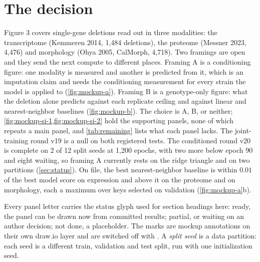 
\section{The decision}
\label{sec:decision}

Figure 3 covers single-gene deletions read out in three modalities: the transcriptome
(Kemmeren 2014, 1,484 deletions), the proteome (Messner 2023, 4,476) and morphology (Ohya
2005, CalMorph, 4,718). Two framings are open and they send the next compute to different
places. Framing A is a conditioning figure: one modality is measured and another is
predicted from it, which is an imputation claim and needs the conditioning measurement for
every strain the model is applied to (\cref{fig:mockup-a}). Framing B is a genotype-only
figure: what the deletion alone predicts against each replicate ceiling and against linear
and nearest-neighbor baselines (\cref{fig:mockup-b}). The choice is A, B, or neither;
\cref{fig:mockup-si-1,fig:mockup-si-2} hold the supporting panels, none of which repeats a
main panel, and
\cref{tab:remaining} lists what each panel lacks. The joint-training round v19 is a null on
both registered tests. The conditioned round v20 is complete on 2 of 12 split seeds at
1{,}200 epochs, with two more below epoch 90 and eight waiting, so framing A currently rests
on the ridge triangle and on two partitions (\cref{sec:status}). On file, the best nearest-neighbor baseline is within $0.01$ of the best model
score on expression and above it on the proteome and on morphology, each a maximum over
keys selected on validation (\cref{fig:mockup-a}b).

 Every panel letter carries the status glyph used for section headings
here:  ready, the panel can be drawn now from committed results;
 partial, or waiting on an author decision;  not done, a
placeholder. The marks are mockup annotations on their own draw.io layer and are switched
off with . A \emph{split seed} is a data partition: each seed is a
different train, validation and test split, run with one initialization seed.
